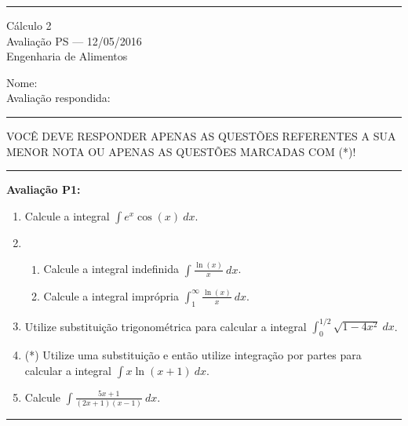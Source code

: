 \documentclass{article}
\newcommand{\ds}{\displaystyle}
\begin{document}
\noindent{}\rule{\textwidth}{0.4pt}
\begin{center}
	C\'alculo 2\\
	Avalia\c{c}\~ao PS --- 12/05/2016 \\
	Engenharia de Alimentos \\
	\vspace{0.2cm}
\end{center}
Nome: \\
Avalia\c{c}\~ao respondida: \\
\noindent{}\rule{\textwidth}{0.4pt}

\begin{center}
VOC\^E DEVE RESPONDER APENAS AS QUEST\~OES REFERENTES A SUA MENOR NOTA OU APENAS AS QUEST\~OES MARCADAS COM (*)!\@
\end{center}

\noindent{}\rule{\textwidth}{0.4pt}

{\bf Avalia\c{c}\~ao P1:}
\begin{enumerate}
\item Calcule a integral $\displaystyle\int e^x \cos(x)\ dx$.

\item
	\begin{enumerate}
		\item Calcule a integral indefinida $\displaystyle\int \frac{\ln(x)}{x}\ dx$.
		\item Calcule a integral impr\'opria $\displaystyle\int_1^\infty \frac{\ln(x)}{x}\ dx$.
	\end{enumerate}

\item Utilize substitui\c{c}\~ao trigonom\'etrica para calcular a integral $\displaystyle\int_0^{1/2} \sqrt{1-4x^2}\ dx$.

\item (*) Utilize uma substitui\c{c}\~ao e ent\~ao utilize integra\c{c}\~ao por partes para calcular a integral $\displaystyle\int x\ln(x+1)\ dx$.

\item Calcule $\ds\int\frac{5x+1}{(2x+1)(x-1)}\ dx$.

\end{enumerate}
\noindent{}\rule{\textwidth}{0.4pt}
\end{document}
